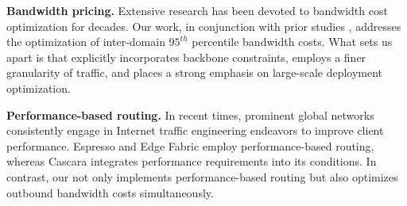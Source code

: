\noindent \textbf{Bandwidth pricing.}
Extensive research \cite{singh2021costCascara,jalaparti2016dynamicPretium,goldenberg2004optimizing,zhang2010optimizingEntact,chen2022onlineOnTPC} has been devoted to bandwidth cost optimization for decades. Our work, in conjunction with prior studies \cite{chen2022onlineOnTPC, singh2021costCascara, goldenberg2004optimizing}, addresses the optimization of inter-domain $95^{th}$ percentile bandwidth costs. What sets us apart is that {\sys} explicitly incorporates backbone constraints, employs a finer granularity of traffic, and places a strong emphasis on large-scale deployment optimization.




\noindent \textbf{Performance-based routing.}
In recent times, prominent global networks \cite{yap2017espresso, schlinker2017edgefabric, singh2021costCascara} consistently engage in Internet traffic engineering endeavors to improve client performance. Espresso \cite{yap2017espresso} and Edge Fabric \cite{schlinker2017edgefabric} employ performance-based routing, whereas Cascara \cite{singh2021costCascara} integrates performance requirements into its conditions. In contrast, our {\sys} not only implements performance-based routing but also optimizes outbound bandwidth costs simultaneously. 



